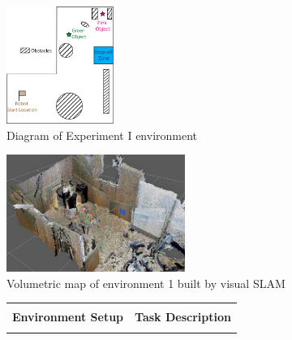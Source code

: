 \documentclass[12pt]{article}
\begin{document}
\begin{figure}
  \begin{subfigure}{0.5\columnwidth}
  \begin{center}
  \includegraphics[height=1.5in]{images/RSSMap.png}
  \caption{Diagram of Experiment I environment}
  \label{fig:map}
  \end{center}
  \end{subfigure}
  \begin{subfigure}{0.5\columnwidth}
  \begin{center}
  \includegraphics[height=1.5in]{images/map4.jpg}
  \caption{Volumetric map of environment 1 built by visual SLAM}
  \label{fig:octomap}
  \end{center}
  \end{subfigure}
  \newcommand{\Lwidth}{0.4\columnwidth}
  \newcommand{\Rwidth}{0.4\columnwidth}
  \newcommand{\Rboxheight}{-0.5\height}
  \setlength{\tabcolsep}{4pt} %
  \begin{subfigure}{\columnwidth}
  \centering
  \begin{tabular}{|c|c|}
  \hline
   & \vspace{-5pt}\\

  \textbf{Environment Setup} & \textbf{Task Description}\\

  \hline
   & \vspace{-5pt}\\
   

\end{tabular}
\end{subfigure}
\end{figure}
\end{document}
